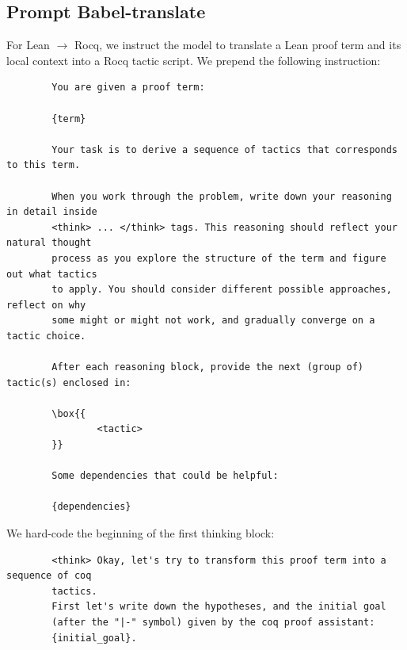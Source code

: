 \documentclass{article}
\theoremstyle{plain}
\theoremstyle{definition}
\theoremstyle{remark}
\begin{document}
	\subsection{Prompt Babel-translate}
	\label{app:promptbabel}
	For Lean $\to$ Rocq, we instruct the model to translate a Lean proof term and its local context into a Rocq tactic script. We prepend the following instruction:
	\begin{verbatim}
		You are given a proof term:
		
		{term}
		
		Your task is to derive a sequence of tactics that corresponds to this term.
		
		When you work through the problem, write down your reasoning in detail inside
		<think> ... </think> tags. This reasoning should reflect your natural thought
		process as you explore the structure of the term and figure out what tactics
		to apply. You should consider different possible approaches, reflect on why 
		some might or might not work, and gradually converge on a tactic choice.
		
		After each reasoning block, provide the next (group of) tactic(s) enclosed in:
		
		\box{{
				<tactic>
		}}
		
		Some dependencies that could be helpful:
		
		{dependencies}
	\end{verbatim}
	We hard-code the beginning of the first thinking block:
	\begin{verbatim}
		<think> Okay, let's try to transform this proof term into a sequence of coq
		tactics.
		First let's write down the hypotheses, and the initial goal
		(after the "|-" symbol) given by the coq proof assistant:
		{initial_goal}.
	\end{verbatim}
	
\end{document}

